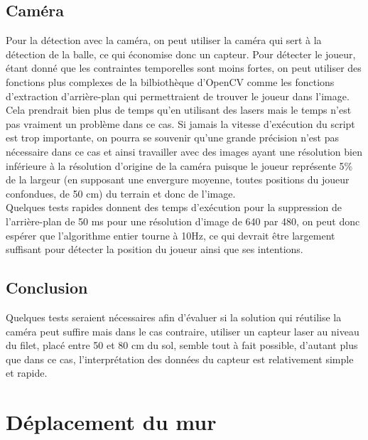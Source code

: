 \section{Caméra}

Pour la détection avec la caméra, on peut utiliser la caméra qui sert à la détection de la balle, ce qui économise donc un capteur. Pour détecter le joueur, étant donné que les contraintes temporelles sont moins fortes, on peut utiliser des fonctions plus complexes de la bilbiothèque d'OpenCV comme les fonctions d'extraction d'arrière-plan qui permettraient de trouver le joueur dans l'image. Cela prendrait bien plus de temps qu'en utilisant des lasers mais le temps n'est pas vraiment un problème dans ce cas. Si jamais la vitesse d'exécution du script est trop importante, on pourra se souvenir qu'une grande précision n'est pas nécessaire dans ce cas et ainsi travailler avec des images ayant une résolution bien inférieure à la résolution d'origine de la caméra puisque le joueur représente 5\% de la largeur (en supposant une envergure moyenne, toutes positions du joueur confondues, de 50 cm) du terrain et donc de l'image. \\ 


Quelques tests rapides donnent des temps d'exécution pour la suppression de l'arrière-plan de 50 ms pour une résolution d'image de 640 par 480, on peut donc espérer que l'algorithme entier tourne à 10Hz, ce qui devrait être largement suffisant pour détecter la position du joueur ainsi que ses intentions. 


\section{Conclusion}

Quelques tests seraient nécessaires afin d'évaluer si la solution qui réutilise la caméra peut suffire mais dans le cas contraire, utiliser un capteur laser au niveau du filet, placé entre 50 et 80 cm du sol, semble tout à fait possible, d'autant plus que dans ce cas, l'interprétation des données du capteur est relativement simple et rapide. 

















\chapter{Déplacement du mur}



